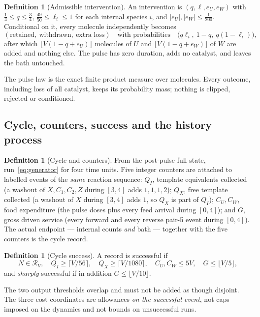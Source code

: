 \documentclass[11pt,a4paper]{article}
\theoremstyle{plain}
\theoremstyle{definition}
\newtheorem{definition}[theorem]{Definition}
\theoremstyle{remark}
\newcommand{\cR}{\mathcal R}
\begin{document}
\begin{definition}[Admissible intervention]\label{def:intervention}
An intervention is $(q,\ell,e_U,e_W)$ with $\tfrac14\le q\le\tfrac34$, $\tfrac{49}{50}\le\ell_i\le1$ for each internal species $i$, and $|e_U|,|e_W|\le\tfrac1{200}$. Conditional on it, every molecule independently becomes
\begin{equation}\label{eq:pulse}
(\text{retained},\ \text{withdrawn},\ \text{extra loss})\quad\text{with probabilities}\quad\bigl(q\ell_i,\ 1-q,\ q(1-\ell_i)\bigr),
\end{equation}
after which $\lfloor V(1-q+e_U)\rfloor$ molecules of $U$ and $\lfloor V(1-q+e_W)\rfloor$ of $W$ are added and nothing else. The pulse has zero duration, adds no catalyst, and leaves the bath untouched.
\end{definition}
The pulse law is the exact finite product measure over molecules. Every outcome, including loss of all catalyst, keeps its probability mass; nothing is clipped, rejected or conditioned.

\subsection{Cycle, counters, success and the history process}\label{sec:cycle}

\begin{definition}[Cycle and counters]\label{def:cycle}
From the post-pulse full state, run~\eqref{eq:generator} for four time units. Five integer counters are attached to labelled events of the \emph{same} reaction sequence: $Q_I$, template equivalents collected (a washout of $X,C_1,C_2,Z$ during $[3,4]$ adds $1,1,1,2$); $Q_X$, free template collected (a washout of $X$ during $[3,4]$ adds $1$, so $Q_X$ is part of $Q_I$); $C_U,C_W$, food expenditure (the pulse doses plus every feed arrival during $[0,4]$); and $G$, gross driven service (every forward and every reverse pair-5 event during $[0,4]$). The actual endpoint --- internal counts \emph{and} bath --- together with the five counters is the cycle record.
\end{definition}

\begin{definition}[Cycle success]\label{def:success}
A record is successful if
\begin{equation}\label{eq:success}
N\in\cR_V,\quad Q_I\ge\lceil V/56\rceil,\quad Q_X\ge\lceil V/1080\rceil,\quad C_U,C_W\le5V,\quad G\le\lfloor V/5\rfloor,
\end{equation}
and \emph{sharply} successful if in addition $G\le\lfloor V/10\rfloor$.
\end{definition}
The two output thresholds overlap and must not be added as though disjoint. The three cost coordinates are allowances \emph{on the successful event}, not caps imposed on the dynamics and not bounds on unsuccessful runs.
\end{document}
